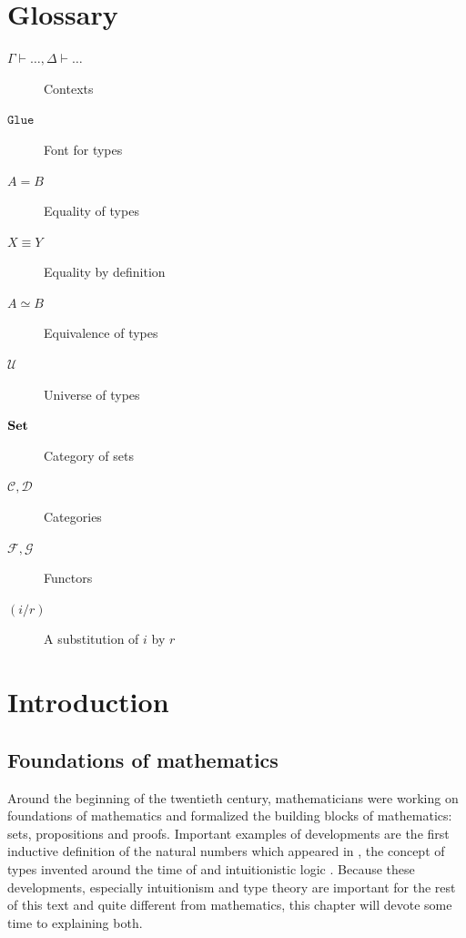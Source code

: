 \documentclass[12pt,a4paper,twoside,xetex]{book}
\newcommand{\op}[1]{\mathtt{#1}}
\begin{document}
\chapter*{Glossary}


\begin{description}
\item[$\Gamma \vdash \ldots, \Delta \vdash \dots$] Contexts
\item[$\op{Glue}$] Font for types
\item[$A = B$] Equality of types
\item[$X \equiv Y$] Equality by definition
\item[$A \simeq B$] Equivalence of types
\item[$\mathcal{U}$] Universe of types
\item[$\text{\textbf{Set}}$] Category of sets
\item[$\mathcal{C}, \mathcal{D}$] Categories
\item[$\mathcal{F}, \mathcal{G}$] Functors
\item[$(i/r)$] A substitution of $i$ by $r$
\end{description}

\listoftodos[Notes]

\newpage

\tableofcontents


\newpage
\setcounter{page}{0}




\chapter{Introduction}

\section{Foundations of mathematics}\label{types}

Around the beginning of the twentieth century, mathematicians were working on foundations of mathematics and formalized the building blocks of mathematics: sets, propositions and proofs. Important examples of developments are the first inductive definition of the natural numbers which appeared in \cite{Peano1879}, the concept of types invented around the time of \cite{Russel1903} and intuitionistic logic \cite{Heyting1930}. Because these developments, especially intuitionism and type theory are important for the rest of this text and quite different from mathematics, this chapter will devote some time to explaining both.
\end{document}
